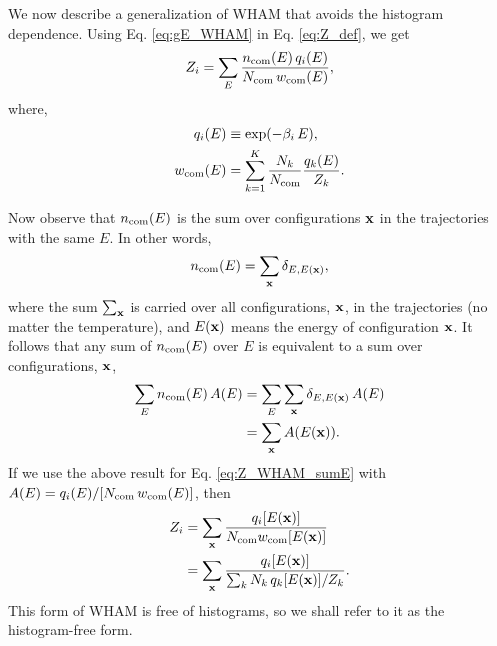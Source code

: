 \documentclass[aip,jcp,preprint,superscriptaddress]{revtex4-1}
\begin{document}
We now describe a generalization of WHAM
that avoids the histogram dependence.
%
Using Eq. \eqref{eq:gE_WHAM} in Eq. \eqref{eq:Z_def},
we get
\begin{align}
  Z_i
  =
  \sum_E
  \frac{ n_{\mathrm{com}} (E) \, q_i(E) }
       { N_{\mathrm{com}} \, w_{\mathrm{com}}(E) },
  \label{eq:Z_WHAM_sumE}
\end{align}
%
where,
\begin{align}
  q_i(E) &\equiv \exp(-\beta_i \, E), \\
  w_{\mathrm{com}}(E) &= \sum_{k = 1}^K
  \frac{ N_k } { N_{\mathrm{com}} }
  \frac{ q_k(E) } { Z_k }.
  \label{eq:wcom_def}
\end{align}



Now observe that
$n_{\mathrm{com}}(E)$
is the sum over configurations $\mathbf{x}$ in the trajectories
with the same $E$.
%
In other words,
\begin{align}
  n_{\mathrm{com}}(E)
  =
  \sum_{\mathbf{x}} \delta_{E, E(\mathbf{x})},
  \label{eq:nE_sumx}
\end{align}
%
where the sum $\sum_{\mathbf{x}}$
is carried over all configurations, $\mathbf{x}$,
in the trajectories (no matter the temperature),
and $E(\mathbf{x})$ means the energy of configuration $\mathbf{x}$.
%
It follows that any sum of $n_{\mathrm{com}}(E)$ over $E$
is equivalent to a sum over configurations, $\mathbf{x}$,
\begin{align*}
  \sum_E n_{\mathrm{com}}(E) \, A(E)
  &=
  \sum_E \sum_{\mathbf{x}} \delta_{E, E(\mathbf{x})} \, A(E) \\
  &=
  \sum_{\mathbf{x}} A(E(\mathbf{x})).
\end{align*}
%
If we use the above result for Eq. \eqref{eq:Z_WHAM_sumE}
with $A(E) = q_i(E)/[N_{\mathrm{com}} \, w_{\mathrm{com}}(E)]$,
then
%
\begin{align}
  Z_i
  &=
  \sum_{\mathbf{x}}
  \frac{ q_i[ E(\mathbf{x}) ] }
       { N_{\mathrm{com}} w_{\mathrm{com}}[ E(\mathbf{x}) ] }
        \notag \\
  &=
  \sum_{\mathbf{x}}
  \frac{ q_i[ E(\mathbf{x}) ] }
  { \sum_k N_k \, q_k[ E(\mathbf{x}) ] / Z_k }.
  \label{eq:Z_WHAM_sumx}
\end{align}
%
This form of WHAM is free of histograms,
so we shall refer to it as the histogram-free form.
\end{document}
